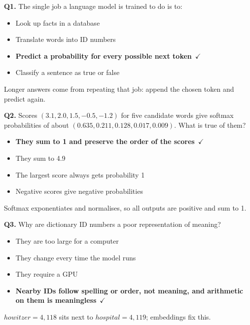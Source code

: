 \documentclass[11pt]{article}
\begin{document}
{\small

\noindent\textbf{Q1.} The single job a language model is trained to do is to:\begin{itemize}[leftmargin=2.2em,itemsep=0pt,topsep=1pt]\item[A.] Look up facts in a database\item[B.] Translate words into ID numbers\item[\textbf{C.}] \textbf{Predict a probability for every possible next token}~{\color{GrnN}$\checkmark$}\item[D.] Classify a sentence as true or false\end{itemize} Longer answers come from repeating that job: append the chosen token and predict again.\par\medskip

\noindent\textbf{Q2.} Scores $(3.1,2.0,1.5,-0.5,-1.2)$ for five candidate words give softmax probabilities of about $(0.635,0.211,0.128,0.017,0.009)$. What is true of them?\begin{itemize}[leftmargin=2.2em,itemsep=0pt,topsep=1pt]\item[\textbf{A.}] \textbf{They sum to 1 and preserve the order of the scores}~{\color{GrnN}$\checkmark$}\item[B.] They sum to 4.9\item[C.] The largest score always gets probability 1\item[D.] Negative scores give negative probabilities\end{itemize} Softmax exponentiates and normalises, so all outputs are positive and sum to 1.\par\medskip

\noindent\textbf{Q3.} Why are dictionary ID numbers a poor representation of meaning?\begin{itemize}[leftmargin=2.2em,itemsep=0pt,topsep=1pt]\item[A.] They are too large for a computer\item[B.] They change every time the model runs\item[C.] They require a GPU\item[\textbf{D.}] \textbf{Nearby IDs follow spelling or order, not meaning, and arithmetic on them is meaningless}~{\color{GrnN}$\checkmark$}\end{itemize} $howitzer=4{,}118$ sits next to $hospital=4{,}119$; embeddings fix this.\par\medskip

}
\end{document}
